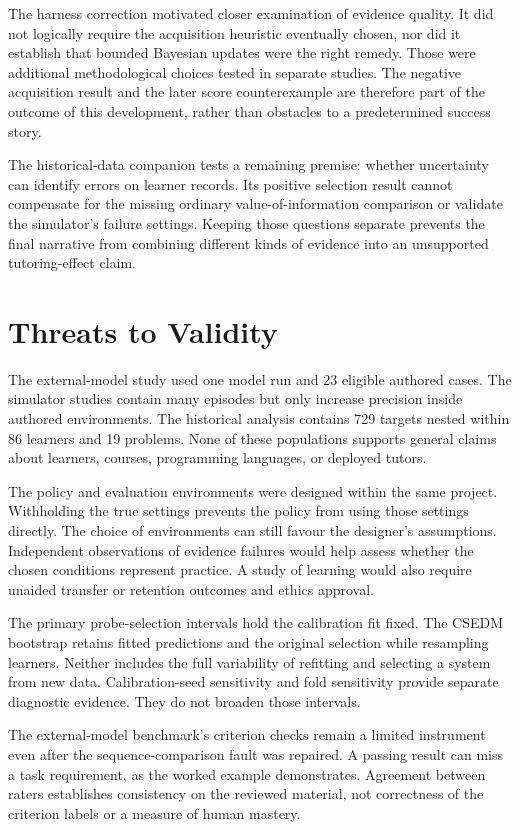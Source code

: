 The harness correction motivated closer examination of evidence quality. It did not logically require the acquisition
heuristic eventually chosen, nor did it establish that bounded Bayesian updates were the right remedy. Those were additional
methodological choices tested in separate studies. The negative acquisition result and the later score counterexample are
therefore part of the outcome of this development, rather than obstacles to a predetermined success story.

The historical-data companion tests a remaining premise: whether uncertainty can identify errors on learner records.
Its positive selection result cannot compensate for the missing ordinary value-of-information comparison or validate the
simulator's failure settings. Keeping those questions separate prevents the final narrative from combining different kinds
of evidence into an unsupported tutoring-effect claim.

\section{Threats to Validity}

The external-model study used one model run and 23 eligible authored cases. The simulator studies contain many episodes but only
increase precision inside authored environments. The historical analysis contains 729 targets nested within 86 learners and 19
problems. None of these populations supports general claims about learners, courses, programming languages, or deployed tutors.

The policy and evaluation environments were designed within the same project. Withholding the true settings prevents the
policy from using those settings directly. The choice of environments can still favour the designer's assumptions.
Independent observations of evidence failures would help assess whether the chosen conditions represent practice.
A study of learning would also require unaided transfer or retention outcomes and ethics approval.

The primary probe-selection intervals hold the calibration fit fixed. The CSEDM bootstrap retains fitted predictions and the original
selection while resampling learners. Neither includes the full variability of refitting and selecting a system from new data.
Calibration-seed sensitivity and fold sensitivity provide separate diagnostic evidence. They do not broaden those intervals.

The external-model benchmark's criterion checks remain a limited instrument even after the sequence-comparison fault was repaired. A passing result
can miss a task requirement, as the worked example demonstrates. Agreement between raters establishes consistency on the
reviewed material, not correctness of the criterion labels or a measure of human mastery.

